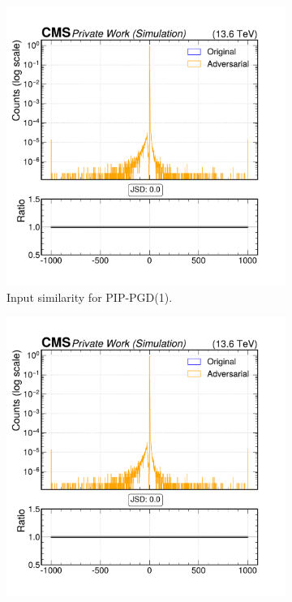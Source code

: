 \begin{figure}[h]
  \centering
  \begin{subfigure}[t]{0.32\textwidth}
    \includegraphics[width=\linewidth]{media/output/features/compare/combined_it_1/cmp_vtx_arr_sv_normchi2.pdf}
    \caption*{Input similarity for PIP-PGD(1).}
  \end{subfigure}\hfill
  \begin{subfigure}[t]{0.32\textwidth}
    \includegraphics[width=\linewidth]{media/output/features/compare/combined_it_2/cmp_vtx_arr_sv_normchi2.pdf}

\end{subfigure}
\end{figure}
